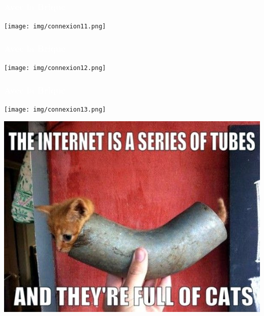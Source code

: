 \documentclass[notes=hide]{beamer}
\begin{document}
\begin{frame}[t]
\frametitle{\textcolor{white}{Avec la Brique}}
  \color{red!60} %
  \begin{center}
  \texttt{[image: img/connexion11.png]}
  \end{center}
\end{frame}
\begin{frame}[t]
\frametitle{\textcolor{white}{Avec la Brique}}
  \begin{center}
  \texttt{[image: img/connexion12.png]}
  \end{center}
\end{frame}
\begin{frame}[t]
\frametitle{\textcolor{white}{Avec la Brique}}
  \begin{center}
  \texttt{[image: img/connexion13.png]}
  \end{center}
\end{frame}
\begin{frame}[t,plain]
\begin{center}
  \vspace{\fill}
  \includegraphics[width=\textwidth]{img/internet-tubes-cat.jpg}
  \vspace{\fill}
\end{center}
\end{frame}
\end{document}
